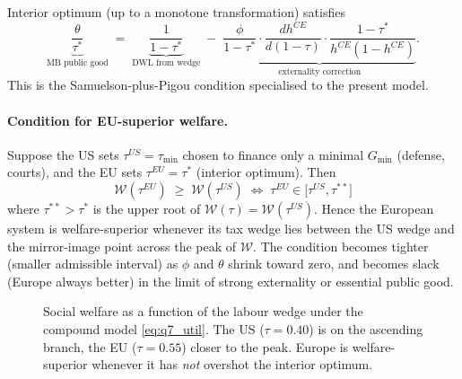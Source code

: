 \documentclass[11pt,a4paper]{article}
\begin{document}
Interior optimum (up to a monotone transformation) satisfies
\begin{equation}
\underbrace{\frac{\theta}{\tau^{*}}}_{\text{MB public good}}
\;=\;\underbrace{\frac{1}{1-\tau^{*}}}_{\text{DWL from wedge}}
\;-\;\underbrace{\frac{\phi}{1-\tau^{*}}\cdot\frac{dh^{CE}}{d(1-\tau)}\cdot\frac{1-\tau^{*}}{h^{CE}(1-h^{CE})}}_{\text{externality correction}}.
\label{eq:q7_interior}
\end{equation}
This is the Samuelson-plus-Pigou condition specialised to the present model.

\paragraph{Condition for EU-superior welfare.}
Suppose the US sets $\tau^{US}=\tau_{\min}$ chosen to finance only a minimal $G_{\min}$ (defense, courts), and the EU sets $\tau^{EU}=\tau^{*}$ (interior optimum). Then
\begin{equation}
\mathcal{W}(\tau^{EU})\;\ge\;\mathcal{W}(\tau^{US})
\;\Longleftrightarrow\; \tau^{EU}\in\bigl[\tau^{US},\tau^{**}\bigr]
\label{eq:q7_EU_sup}
\end{equation}
where $\tau^{**}>\tau^{*}$ is the upper root of $\mathcal{W}(\tau)=\mathcal{W}(\tau^{US})$. Hence the European system is welfare-superior whenever its tax wedge lies between the US wedge and the mirror-image point across the peak of $\mathcal{W}$. The condition becomes tighter (smaller admissible interval) as $\phi$ and $\theta$ shrink toward zero, and becomes slack (Europe always better) in the limit of strong externality or essential public good.

\begin{figure}[ht]
\centering
{}
\caption{\small Social welfare as a function of the labour wedge under the compound model \eqref{eq:q7_util}. The US ($\tau=0.40$) is on the ascending branch, the EU ($\tau=0.55$) closer to the peak. Europe is welfare-superior whenever it has \emph{not} overshot the interior optimum.}
\label{fig:q7_welfare}
\end{figure}
\end{document}
